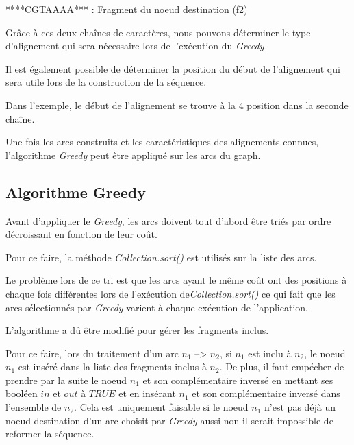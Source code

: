 \documentclass[12pt,a4paper,final]{article}
\begin{document}
****CGTAAAA*** : Fragment du noeud destination (f2) \medskip


Grâce à ces deux chaînes de caractères, nous pouvons déterminer le type d'alignement qui sera nécessaire lors de l'exécution du \textit{Greedy}\medskip


Il est également possible de déterminer la position du début de l'alignement qui sera utile lors de la construction de la séquence.\medskip

Dans l'exemple, le début de l'alignement se trouve à la 4 position dans la seconde chaîne.\medskip

Une fois les arcs construits et les caractéristiques des alignements connues, l'algorithme \textit{Greedy} peut être appliqué sur les arcs du graph.\medskip

\subsection{Algorithme Greedy}

Avant d'appliquer le \textit{Greedy}, les arcs doivent tout d'abord être triés par ordre décroissant en fonction de leur coût.\medskip

Pour ce faire, la méthode \textit{Collection.sort()} est utilisés sur la liste des arcs.\medskip

Le problème lors de ce tri est que les arcs ayant le même coût ont des positions à chaque fois différentes lors de l'exécution de\textit{Collection.sort()} ce qui fait que les arcs sélectionnés par \textit{Greedy} varient à chaque exécution de l'application.\medskip

L'algorithme a dû être modifié pour gérer les fragments inclus.\medskip

Pour ce faire, lors du traitement d'un arc $n_1$ --> $n_2$, si $n_1$ est inclu à $n_2$, le noeud $n_1$ est inséré dans la liste des fragments inclus à $n_2$.  De plus, il faut empécher de prendre par la suite le noeud $n_1$ et son complémentaire inversé en mettant ses booléen $in$ et $out$ à $TRUE$ et en insérant $n_1$ et son complémentaire inversé dans l'ensemble de $n_2$.  Cela est uniquement faisable si le noeud $n_1$ n'est pas déjà un noeud destination d'un arc choisit par \textit{Greedy} aussi non il serait impossible de reformer la séquence. \medskip
\end{document}
